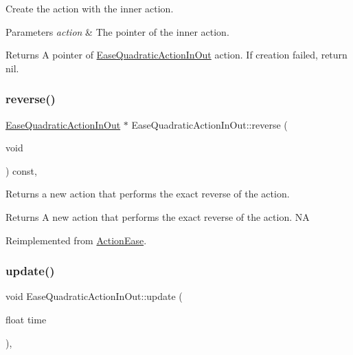 Create the action with the inner action. 


\begin{DoxyParams}{Parameters}
{\em action} & The pointer of the inner action. \\
\hline
\end{DoxyParams}
\begin{DoxyReturn}{Returns}
A pointer of \hyperlink{classEaseQuadraticActionInOut}{Ease\+Quadratic\+Action\+In\+Out} action. If creation failed, return nil. 
\end{DoxyReturn}
\mbox{\label{classEaseQuadraticActionInOut_ab77788315a86df25eb5760c4a0970828}} 
\subsubsection{\texorpdfstring{reverse()}{reverse()}}
{\footnotesize\ttfamily \hyperlink{classEaseQuadraticActionInOut}{Ease\+Quadratic\+Action\+In\+Out} $\ast$ Ease\+Quadratic\+Action\+In\+Out\+::reverse (\begin{DoxyParamCaption}\item[{void}]{ }\end{DoxyParamCaption}) const\hspace{0.3cm}{\ttfamily [override]}, {\ttfamily [virtual]}}

Returns a new action that performs the exact reverse of the action.

\begin{DoxyReturn}{Returns}
A new action that performs the exact reverse of the action.  NA 
\end{DoxyReturn}


Reimplemented from \hyperlink{classActionEase_ab99eb083fa033fae1d6c948fdc730782}{Action\+Ease}.

\mbox{\label{classEaseQuadraticActionInOut_ac72e1da241d156a748cf02d5cb8e72c1}} 
\subsubsection{\texorpdfstring{update()}{update()}}
{\footnotesize\ttfamily void Ease\+Quadratic\+Action\+In\+Out\+::update (\begin{DoxyParamCaption}\item[{float}]{time }\end{DoxyParamCaption})\hspace{0.3cm}{\ttfamily [override]}, {\ttfamily [virtual]}}

